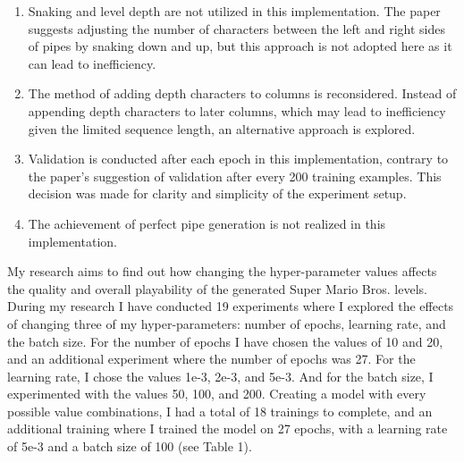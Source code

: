 \documentclass[runningheads]{llncs}
\begin{document}
\begin{enumerate}

\item Snaking and level depth are not utilized in this implementation. The paper suggests adjusting the number of characters between the left and right sides of pipes by snaking down and up, but this approach is not adopted here as it can lead to inefficiency.

\item The method of adding depth characters to columns is reconsidered. Instead of appending depth characters to later columns, which may lead to inefficiency given the limited sequence length, an alternative approach is explored.

\item Validation is conducted after each epoch in this implementation, contrary to the paper's suggestion of validation after every 200 training examples. This decision was made for clarity and simplicity of the experiment setup.

\item The achievement of perfect pipe generation is not realized in this implementation.

\end{enumerate}

My research aims to find out how changing the hyper-parameter values affects the quality and overall playability of the generated Super Mario Bros. levels. During my research I have conducted 19 experiments where I explored the effects of changing three of my hyper-parameters: number of epochs, learning rate, and the batch size. For the number of epochs I have chosen the values of 10 and 20, and an additional experiment where the number of epochs was 27. For the learning rate, I chose the values 1e-3, 2e-3, and 5e-3. And for the batch size, I experimented with the values 50, 100, and 200. Creating a model with every possible value combinations, I had a total of 18 trainings to complete, and an additional training where I trained the model on 27 epochs, with a learning rate of 5e-3 and a batch size of 100 (see Table 1).
\end{document}
